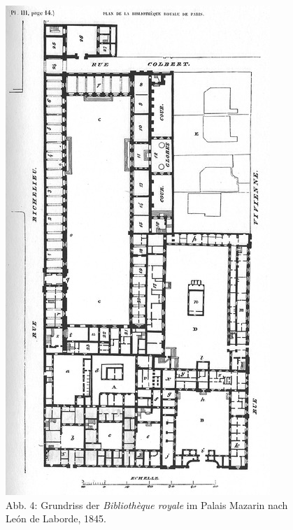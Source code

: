 \begin{figure}[htbp]
\centering
\includegraphics{img/wagner-4.jpg}
\caption{Abb. 4: Grundriss der \emph{Bibliothèque royale} im Palais
Mazarin nach León de Laborde, 1845.}
\end{figure}

